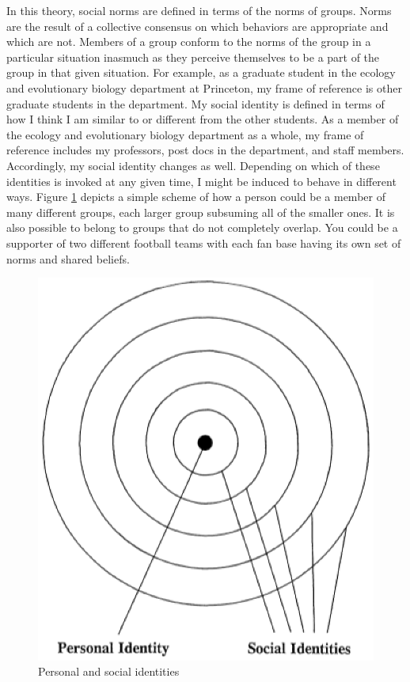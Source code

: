 \documentclass[rutwik_proposal.tex]{subfiles}
\begin{document}
In this theory, social norms are defined in terms of the norms of groups. Norms are the result of a collective consensus on which behaviors are appropriate and which are not. Members of a group conform to the norms of the group in a particular situation inasmuch as they perceive themselves to be a part of the group in that given situation. For example, as a graduate student in the ecology and evolutionary biology department at Princeton, my frame of reference is other graduate students in the department. My social identity is defined in terms of how I think I am similar to or different from the other students. As a member of the ecology and evolutionary biology department as a whole, my frame of reference includes my professors, post docs in the department, and staff members. Accordingly, my social identity changes as well. Depending on which of these identities is invoked at any given time, I might be induced to behave in different ways. Figure \ref{fig:soc_id} depicts a simple scheme of how a person could be a member of many different groups, each larger group subsuming all of the smaller ones. It is also possible to belong to groups that do not completely overlap. You could be a supporter of two different football teams with each fan base having its own set of norms and shared beliefs.

\begin{figure}[h]
\centering
\includegraphics{Images/multi_id}
\caption{Personal and social identities \cite{Brewer91}}
\label{fig:soc_id}
\end{figure}
\end{document}
